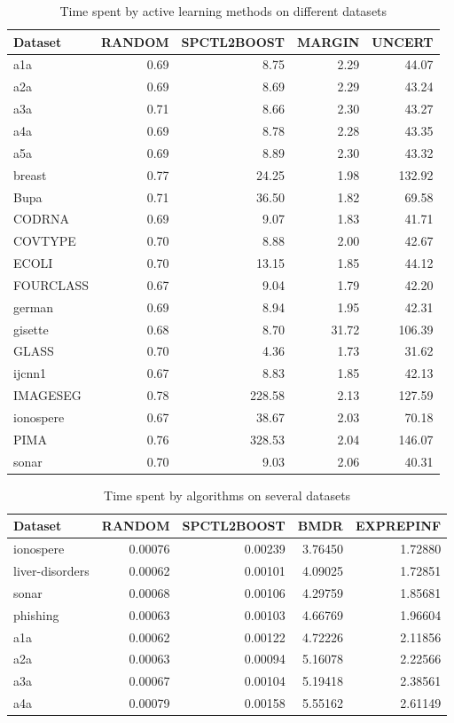 \documentclass[12pt]{article}
\begin{document}
	\begin{table}[h!]
		\centering
		\caption{Time spent by active learning methods on different datasets}
		\label{tab:time}
		\begin{tabular}{l|r|r|r|r}
			\hline
			Dataset & RANDOM & SPCTL2BOOST & MARGIN & UNCERT \\
			\hline
			a1a & 0.69 & 8.75 & 2.29 & 44.07 \\
			a2a & 0.69 & 8.69 & 2.29 & 43.24 \\
			a3a & 0.71 & 8.66 & 2.30 & 43.27 \\
			a4a & 0.69 & 8.78 & 2.28 & 43.35 \\
			a5a & 0.69 & 8.89 & 2.30 & 43.32 \\
			breast & 0.77 & 24.25 & 1.98 & 132.92 \\
			Bupa & 0.71 & 36.50 & 1.82 & 69.58 \\
			CODRNA & 0.69 & 9.07 & 1.83 & 41.71 \\
			COVTYPE & 0.70 & 8.88 & 2.00 & 42.67 \\
			ECOLI & 0.70 & 13.15 & 1.85 & 44.12 \\
			FOURCLASS & 0.67 & 9.04 & 1.79 & 42.20 \\
			german & 0.69 & 8.94 & 1.95 & 42.31 \\
			gisette & 0.68 & 8.70 & 31.72 & 106.39 \\
			GLASS & 0.70 & 4.36 & 1.73 & 31.62 \\
			ijcnn1 & 0.67 & 8.83 & 1.85 & 42.13 \\
			IMAGESEG & 0.78 & 228.58 & 2.13 & 127.59 \\
			ionospere & 0.67 & 38.67 & 2.03 & 70.18 \\
			PIMA & 0.76 & 328.53 & 2.04 & 146.07 \\
			sonar & 0.70 & 9.03 & 2.06 & 40.31 \\
			\hline
		\end{tabular}
	\end{table}
	
	\begin{table}[h!]
		\centering
		\caption{Time spent by algorithms on several datasets}
		\label{tab:time2}
		\begin{tabular}{l|r|r|r|r}
			\hline
			Dataset & RANDOM & SPCTL2BOOST & BMDR & EXPREPINF \\
			\hline
			ionospere & 0.00076 & 0.00239 & 3.76450 & 1.72880 \\
			liver-disorders & 0.00062 & 0.00101 & 4.09025 & 1.72851 \\
			sonar & 0.00068 & 0.00106 & 4.29759 & 1.85681 \\
			phishing & 0.00063 & 0.00103 & 4.66769 & 1.96604 \\
			a1a & 0.00062 & 0.00122 & 4.72226 & 2.11856 \\
			a2a & 0.00063 & 0.00094 & 5.16078 & 2.22566 \\
			a3a & 0.00067 & 0.00104 & 5.19418 & 2.38561 \\
			a4a & 0.00079 & 0.00158 & 5.55162 & 2.61149 \\
			\hline
		\end{tabular}
	\end{table}
	
\end{document}
